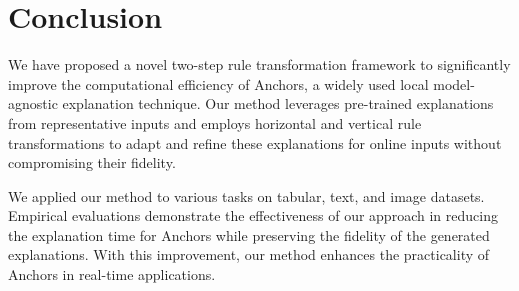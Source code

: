 \section{Conclusion}

We have proposed a novel two-step rule transformation framework to significantly improve the computational efficiency of Anchors, a widely used local model-agnostic explanation technique. Our method leverages pre-trained explanations from representative inputs and employs horizontal and vertical rule transformations to adapt and refine these explanations for online inputs without compromising their fidelity.

We applied our method to various tasks on tabular, text, and image datasets. Empirical evaluations demonstrate the effectiveness of our approach in reducing the explanation time for Anchors while preserving the fidelity of the generated explanations. With this improvement, our method enhances the practicality of Anchors in real-time applications.